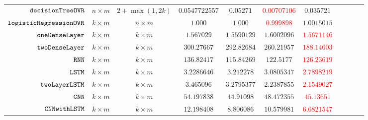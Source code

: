 {\begin {table}[H]
\begin{center}
{\begin{tabular}{| >{\tiny}r | c | c | c | c | c | c | c | c | c | c  }
         $  \mathtt{decisionTreeOVR}$ & $n \times m$ &  $2+\max(1,2k)  $ &  $0.0547722557  $ & $0.05271$  &  \textcolor{red}{$0.00707106 $} & $0.035721$  \\
         $  \mathtt{logisticRegressionOVR}$    & $k \times m$ &  $ n \times m $ &  $ 1.000  $  &  $ 1.000 $ & \textcolor{red}{$ 0.999898$} & $ 1.0015015 $ \\
         $  \mathtt{oneDenseLayer}$ & $ k \times m  $  & $ k \times m $   &  $ 1.567029  $  &  {$ 1.5590129 $} & $1.6002096$ & \textcolor{red}{$ 1.5671146 $}  \\
         {$ \mathtt{twoDenseLayer}$} & $ k \times m  $  & $ k \times m $ &  $ 300.27667 $  &  $ 292.82684 $ & $ 260.21957 $ & \textcolor{red}{$ 188.14603 $}  \\
         $  \mathtt{RNN}$           & $ k \times m  $  & $ k \times m $ &  $ 136.82417 $  &  $ 115.84269 $ & $ 122.5177 $ & \textcolor{red}{$ 126.23619 $}  \\
         $  \mathtt{LSTM}$          & $ k \times m $   &  $ k \times m $  &  $ 3.2286646  $  &  $ 3.212278 $ & $3.0805347$ & \textcolor{red}{${2.7898219}$}  \\
         $  \mathtt{twoLayerLSTM}$  & $ k \times m $ &  $ k \times m $  &  $ 3.465096  $  &  $3.2795377$ & {${2.2387855}$} & \textcolor{red}{$2.1549027$}  \\
         $ \mathtt{CNN}$ & $ k \times m $ &  $  k \times m $ &  $54.197838$  &  $44.91098$ & $48.472355$ & \textcolor{red}{$45.13651$}  \\
         $ \mathtt{CNNwithLSTM}$ & $ k \times m $ &  $ k \times m $ &  $ 12.198408  $  &  $  8.806086$ & $ 10.579981 $ & \textcolor{red}{$ 6.6821547 $} \\
         \hline \hline
        \end{tabular}
}
\end{center}
\end{table}
}


